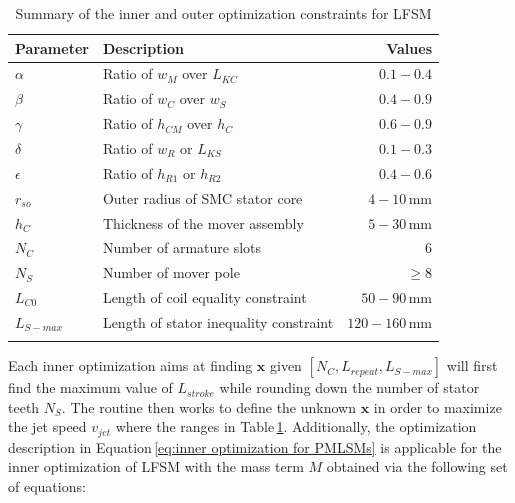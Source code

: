                 
                \begin{table}[!ht]
                    \renewcommand{\arraystretch}{1.2}
                    \caption{Summary of the inner and outer optimization constraints for \acs{LFSM}}
                    \label{table:chap/rsm/LFSM/optimization unknown constraints}
                    \centering
                    \begin{tabular}{@{}llr@{}}
                    \hline
                    \bfseries Parameter & \bfseries Description & \bfseries Values\\
                    \hline
                        $\alpha$	    & Ratio of $w_M$ over $L_{KC}$              &	$0.1-0.4$\\ 
                        $\beta$	        & Ratio of $w_C$ over $w_S$		            &	$0.4-0.9$\\ 
                        $\gamma$	    & Ratio of $h_{CM}$ over $h_C$			    &	$0.6-0.9$\\ 
                        $\delta$	    & Ratio of $w_R$ or $L_{KS}$		        &	$0.1-0.3$\\ 
                        $\epsilon$	    & Ratio of $h_{R1}$ or $h_{R2}$		        &	$0.4-0.6$\\ 
                        $r_{so}$	    & Outer radius of SMC stator core 			&	$4-10\,\mathrm{mm}$\\ 
                        $h_C$           & Thickness of the mover assembly           &	$5-30\,\mathrm{mm}$\\ 
                    \hline
                        $N_C$	        & Number of armature slots 		            &	$6$\\ 
                        $N_S$	        & Number of mover pole 		                &	$\geq 8$\\ 
                        $L_{C0}$	    & Length of coil equality constraint		&	$50-90\,\mathrm{mm}$\\ 
                        $L_{S-max}$	    & Length of stator inequality constraint	&	$120-160\,\mathrm{mm}$\\
                    \hline  \\
                    \end{tabular}
                \end{table}    
                
                
                Each inner optimization aims at finding $\textbf{x}$ given $[N_C, L_{repeat}, L_{S-max}]$ will first find the maximum value of $L_{stroke}$ while rounding down the number of stator teeth $N_S$. The routine then works to define the unknown $\textbf{x}$ in order to maximize the jet speed $v_{jet}$ where the ranges in Table\,\ref{table:chap/rsm/LFSM/optimization unknown constraints}. Additionally, the optimization description in Equation\,\ref{eq:inner optimization for PMLSMs} is applicable for the inner optimization of \acs{LFSM} with the mass term $M$ obtained via the following set of equations:
                
